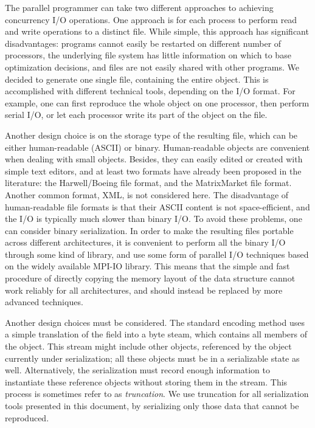 \documentclass[11pt,relax]{SANDreport}
\begin{document}
The parallel programmer can take two different approaches to achieving
concurrency I/O operations. One approach is for each process to perform read
and write operations to a distinct file. While simple, this approach has
significant disadvantages: programs cannot easily be restarted on different
number of processors, the underlying file system has little information on
which to base optimization decisions, and files are not easily shared with
other programs. We decided to generate one single file, containing the entire
object. This is accomplished with different technical tools, depending on the
I/O format. For example, one can first reproduce the whole object on one
processor, then perform serial I/O, or let each processor write its part of
the object on the file.

Another design choice is  on the storage type of the resulting file, which
can be either human-readable (ASCII) or binary.
Human-readable objects are convenient when dealing with small objects.
Besides, they can easily edited or created with simple text editors, and at
least two formats have already been proposed in the literature: the
Harwell/Boeing file format, and the MatrixMarket file format. Another common
format, XML, is not considered here. The
disadvantage of human-readable file formats is that their ASCII content is not
space-efficient, and the I/O is typically much slower than binary I/O. To
avoid these problems,
one can consider binary serialization. In order to make the resulting files
portable across different architectures, it is convenient to perform all the
binary I/O through some kind of library, and use some form of parallel I/O
techniques based on the widely available MPI-IO library.  This means that the
simple and fast procedure of directly copying the memory layout of the data
structure cannot work reliably for all architectures, and should instead be
replaced by more advanced techniques.

Another design choices must be considered.
The standard encoding method uses a simple translation of the field into a
byte steam, which contains all members of the object. This stream might
include other objects, referenced by the object currently under serialization;
all these objects must be in a serializable state as well. Alternatively, the
serialization must record enough information to instantiate these reference
objects without storing them in the stream. This process is sometimes refer to
as {\sl truncation}. We use truncation for all serialization tools presented
in this document, by serializing only those data that cannot be reproduced.
\end{document}
